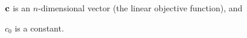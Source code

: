 \item $\mathbf{c}$ is an $n$-dimensional vector (the linear objective
  function), and 
\item $c_0$ is a constant.
